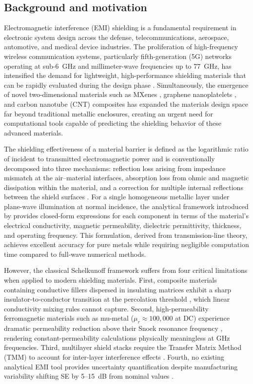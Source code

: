 \documentclass[review,3p,authoryear]{elsarticle}
\begin{document}
\subsection{Background and motivation}

Electromagnetic interference (EMI) shielding is a fundamental requirement in electronic system design across the defense, telecommunications, aerospace, automotive, and medical device industries. The proliferation of high-frequency wireless communication systems, particularly fifth-generation (5G) networks operating at sub-6~GHz and millimeter-wave frequencies up to 77~GHz, has intensified the demand for lightweight, high-performance shielding materials that can be rapidly evaluated during the design phase \citep{Wanasinghe2020, Hong2017}. Simultaneously, the emergence of novel two-dimensional materials such as MXenes \citep{Shahzad2016}, graphene nanoplatelets \citep{Shen2014}, and carbon nanotube (CNT) composites \citep{AlSaleh2009} has expanded the materials design space far beyond traditional metallic enclosures, creating an urgent need for computational tools capable of predicting the shielding behavior of these advanced materials.

The shielding effectiveness of a material barrier is defined as the logarithmic ratio of incident to transmitted electromagnetic power and is conventionally decomposed into three mechanisms: reflection loss arising from impedance mismatch at the air--material interfaces, absorption loss from ohmic and magnetic dissipation within the material, and a correction for multiple internal reflections between the shield surfaces \citep{Ott2009, Schulz1988}. For a single homogeneous metallic layer under plane-wave illumination at normal incidence, the analytical framework introduced by \citet{Schelkunoff1934} provides closed-form expressions for each component in terms of the material's electrical conductivity, magnetic permeability, dielectric permittivity, thickness, and operating frequency. This formulation, derived from transmission-line theory, achieves excellent accuracy for pure metals while requiring negligible computation time compared to full-wave numerical methods.

However, the classical Schelkunoff framework suffers from four critical limitations when applied to modern shielding materials. First, composite materials containing conductive fillers dispersed in insulating matrices exhibit a sharp insulator-to-conductor transition at the percolation threshold \citep{Kirkpatrick1973, Stauffer1994}, which linear conductivity mixing rules cannot capture. Second, high-permeability ferromagnetic materials such as mu-metal ($\mu_r \approx 100{,}000$ at DC) experience dramatic permeability reduction above their Snoek resonance frequency \citep{Snoek1948}, rendering constant-permeability calculations physically meaningless at GHz frequencies. Third, multilayer shield stacks require the Transfer Matrix Method (TMM) to account for inter-layer interference effects \citep{Celozzi2008, Yeh1988}. Fourth, no existing analytical EMI tool provides uncertainty quantification despite manufacturing variability shifting SE by 5--15~dB from nominal values \citep{Paul2006}.
\end{document}
